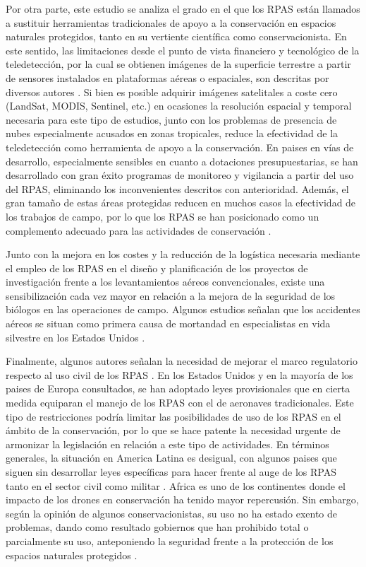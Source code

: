 \documentclass[11pt,]{article}
\begin{document}
Por otra parte, este estudio se analiza el grado en el que los RPAS
están llamados a sustituir herramientas tradicionales de apoyo a la
conservación en espacios naturales protegidos, tanto en su vertiente
científica como conservacionista. En este sentido, las limitaciones
desde el punto de vista financiero y tecnológico de la teledetección,
por la cual se obtienen imágenes de la superficie terrestre a partir de
sensores instalados en plataformas aéreas o espaciales, son descritas
por diversos autores \citep{Koh2012}. Si bien es posible adquirir
imágenes satelitales a coste cero (LandSat, MODIS, Sentinel, etc.) en
ocasiones la resolución espacial y temporal necesaria para este tipo de
estudios, junto con los problemas de presencia de nubes especialmente
acusados en zonas tropicales, reduce la efectividad de la teledetección
como herramienta de apoyo a la conservación. En paises en vías de
desarrollo, especialmente sensibles en cuanto a dotaciones
presupuestarias, se han desarrollado con gran éxito programas de
monitoreo y vigilancia a partir del uso del RPAS, eliminando los
inconvenientes descritos con anterioridad. Además, el gran tamaño de
estas áreas protegidas reducen en muchos casos la efectividad de los
trabajos de campo, por lo que los RPAS se han posicionado como un
complemento adecuado para las actividades de conservación
\citep{Zahawi2015}.

Junto con la mejora en los costes y la reducción de la logística
necesaria mediante el empleo de los RPAS en el diseño y planificación de
los proyectos de investigación frente a los levantamientos aéreos
convencionales, existe una sensibilización cada vez mayor en relación a
la mejora de la seguridad de los biólogos en las operaciones de campo.
Algunos estudios señalan que los accidentes aéreos se situan como
primera causa de mortandad en especialistas en vida silvestre en los
Estados Unidos \citep{Sasse2003}.

Finalmente, algunos autores señalan la necesidad de mejorar el marco
regulatorio respecto al uso civil de los RPAS \citep{Nugraha2016}. En
los Estados Unidos y en la mayoría de los paises de Europa consultados,
se han adoptado leyes provisionales que en cierta medida equiparan el
manejo de los RPAS con el de aeronaves tradicionales. Este tipo de
restricciones podría limitar las posibilidades de uso de los RPAS en el
ámbito de la conservación, por lo que se hace patente la necesidad
urgente de armonizar la legislación en relación a este tipo de
actividades. En términos generales, la situación en America Latina es
desigual, con algunos paises que siguen sin desarrollar leyes
específicas para hacer frente al auge de los RPAS tanto en el sector
civil como militar \citep{Nacion2013}. Africa es uno de los continentes
donde el impacto de los drones en conservación ha tenido mayor
repercusión. Sin embargo, según la opinión de algunos conservacionistas,
su uso no ha estado exento de problemas, dando como resultado gobiernos
que han prohibido total o parcialmente su uso, anteponiendo la seguridad
frente a la protección de los espacios naturales protegidos
\citep{Andrews2014}.
\end{document}
